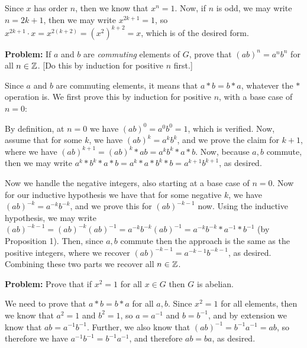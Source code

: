 \documentclass[10pt]{article}
\newenvironment{problem}{\textbf{Problem:}}{}
\begin{document}
	\begin{solution}
		Since \( x \) has order \( n \), then we know that \( x^{n} = 1 \). Now, if \( n \) is odd, 
		we may write \( n = 2k + 1 \), then we may write \( x^{2k + 1} = 1 \), so 
		\( x^{2k + 1} \cdot x = x^{2(k + 2)} = (x^2)^{k + 2} = x \), which is of the desired form. 
	\end{solution}

	\begin{problem}
		If \( a \) and \( b \) are \textit{commuting} elements of \( G \), prove that \( (ab)^{n} = a^{n}b^{n} \) 
		for all \( n \in \mathbb Z \). [Do this by induction for positive \( n \) first.]
	\end{problem}

	\begin{solution}
		Since \( a \) and \( b \) are commuting elements, it means that \( a * b = b * a \), whatever the \( * \) 
		operation is. We first prove this by induction for positive \( n \), with a base case of \( n = 0 \):
		
		By definition, at \( n = 0 \) we have \( (ab)^{0} = a^{0}b^{0} = 1\), which is verified. Now, assume that 
		for some \( k \), we have \( (ab)^{k} = a^{k}b^{k} \), and we prove the claim for \( k + 1 \), where 
		we have \( (ab)^{k + 1} = (ab)^{k} * ab = a^{k}b^{k} * a * b\). Now, because \( a, b \) commute, then 
		we may write \( a^{k}* b^{k} * a * b = a^{k} * a * b^{k} * b = a^{k + 1}b^{k + 1}\), as desired. 

		Now we handle the negative integers, also starting at a base case of \( n = 0 \). Now for our 
		inductive hypothesis we have that for some negative \( k \), we have \( (ab)^{-k} = a^{-k}b^{-k} \), and 
		we prove this for \( (ab)^{-k - 1} \) now. Using the inductive hypothesis, we may write 
		\( (ab)^{-k - 1} = (ab)^{-k} (ab)^{-1} = a^{-k}b^{-k} (ab)^{-1} = a^{-k}b^{-k} * a^{-1} * b^{-1}\) (by 
		Proposition 1). Then, since \( a, b \) commute then the approach is the same as the positive
		integers, where we recover \( (ab)^{-k - 1} = a^{-k -1}b^{-k-1}\), as desired. Combining these two parts 
		we recover all \( n \in \mathbb Z \). 
	\end{solution}

	\begin{problem}
		Prove that if \( x^2 = 1 \) for all \( x \in G \) then \( G \) is abelian. 
	\end{problem}

	\begin{solution}
		We need to prove that \( a * b = b * a \) for all \( a, b \). Since \( x^2 = 1 \) for all elements, then 
		we know that \( a^2 = 1 \) and \( b^2 = 1 \), so \( a = a^{-1} \) and \( b = b^{-1} \), and by extension 
		we know that \( ab = a^{-1}b^{-1} \). Further, we also know that \( (ab)^{-1} = b^{-1} a^{-1} = ab \), so 
		therefore we have \( a^{-1} b^{-1} = b^{-1} a^{-1} \), and therefore \( ab = ba \), as desired. 
	\end{solution}
\end{document}
